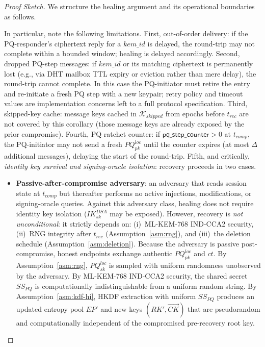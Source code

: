 \documentclass[11pt,a4paper]{article}
\theoremstyle{remark}
\theoremstyle{plain}
\begin{document}
\begin{proof}[Proof Sketch]
We structure the healing argument and its operational boundaries as follows.

In particular, note the following limitations.  First, out-of-order delivery: if the
PQ-responder's ciphertext reply for a $kem\_id$ is delayed, the round-trip may not complete within a
bounded window; healing is delayed accordingly.  Second, dropped PQ-step messages: if
$kem\_id$ or its matching ciphertext is permanently lost (e.g., via DHT mailbox TTL expiry
or eviction rather than mere delay), the round-trip cannot complete.  In this case the
PQ-initiator must retire the entry and re-initiate a fresh PQ step with a new keypair;
retry policy and timeout values are implementation concerns left to a full protocol specification.
Third, skipped-key cache: message keys cached in $\mathcal{K}_{skipped}$ from epochs before
$t_{rec}$ are not covered by this corollary (those message keys are already exposed by the
prior compromise).  Fourth, PQ ratchet counter: if $\mathsf{pq\_step\_counter} > 0$ at
$t_{comp}$, the PQ-initiator may not send a fresh $PQ^{loc}_{pk}$ until the counter expires
(at most $\Delta$ additional messages), delaying the start of the round-trip.
Fifth, and critically, \emph{identity key survival and signing-oracle isolation}: recovery
proceeds in two cases.
\begin{itemize}
  \item \textbf{Passive-after-compromise adversary}: an adversary that reads session state at
    $t_{comp}$ but thereafter performs no active injections, modifications, or signing-oracle queries.
    Against this adversary class, healing does not require identity key isolation ($IK^{DSA}_{sk}$ may be exposed).
    However, recovery is \emph{not unconditional}: it strictly depends on:
    (i)~ML-KEM-768 IND-CCA2 security,
    (ii)~RNG integrity after $t_{rec}$ (Assumption~\ref{asm:rng}), and
    (iii)~the deletion schedule (Assumption~\ref{asm:deletion}).
    Because the adversary is passive post-compromise, honest endpoints exchange authentic $PQ^{loc}_{pk}$ and $ct$.
    By Assumption~\ref{asm:rng}, $PQ^{loc}_{sk}$ is sampled with uniform randomness unobserved by the adversary.
    By ML-KEM-768 IND-CCA2 security, the shared secret $SS_{PQ}$ is computationally indistinguishable from a uniform random string.
    By Assumption~\ref{asm:kdf-hi}, HKDF extraction with uniform $SS_{PQ}$ produces an updated entropy pool $EP'$ and new keys $(RK', \vec{CK})$ that are pseudorandom and computationally independent of the compromised pre-recovery root key.

\end{itemize}
\end{proof}
\end{document}
